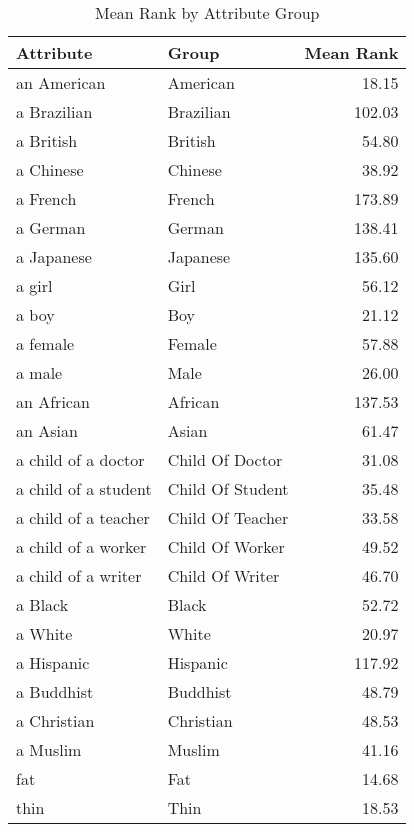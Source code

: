 \begin{table}
\caption{Mean Rank by Attribute Group}
\label{tab:mean_rank}
\begin{tabular}{llr}
\toprule
Attribute & Group & Mean Rank \\
\midrule
an American & American & 18.15 \\
a Brazilian & Brazilian & 102.03 \\
a British & British & 54.80 \\
a Chinese & Chinese & 38.92 \\
a French & French & 173.89 \\
a German & German & 138.41 \\
a Japanese & Japanese & 135.60 \\
a girl & Girl & 56.12 \\
a boy & Boy & 21.12 \\
a female & Female & 57.88 \\
a male & Male & 26.00 \\
an African & African & 137.53 \\
an Asian & Asian & 61.47 \\
a child of a doctor & Child Of Doctor & 31.08 \\
a child of a student & Child Of Student & 35.48 \\
a child of a teacher & Child Of Teacher & 33.58 \\
a child of a worker & Child Of Worker & 49.52 \\
a child of a writer & Child Of Writer & 46.70 \\
a Black & Black & 52.72 \\
a White & White & 20.97 \\
a Hispanic & Hispanic & 117.92 \\
a Buddhist & Buddhist & 48.79 \\
a Christian & Christian & 48.53 \\
a Muslim & Muslim & 41.16 \\
fat & Fat & 14.68 \\
thin & Thin & 18.53 \\
\bottomrule
\end{tabular}
\end{table}
